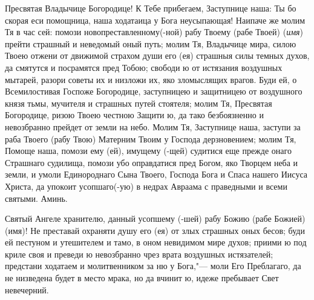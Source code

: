 \mychapterending


\begin{mymulticols}
 


Пресвятая Владычице Богородице! К Тебе прибегаем, Заступнице наша: Ты бо скорая еси помощница, наша ходатаица у Бога неусыпающая! Наипаче же молим Тя в час сей: помози новопреставленному(-ной) рабу Твоему (рабе Твоей) ({\itshape имя}) прейти страшный и неведомый оный путь; молим Тя, Владычице мира, силою Твоею отжени от движимой страхом души его (ея) страшныя силы темных духов, да смятутся и посрамятся пред Тобою; свободи ю от истязания воздушных мытарей, разори советы их и низложи их, яко зломыслящих врагов. Буди ей, о Всемилостивая Госпоже Богородице, заступницею и защитницею от воздушного князя тьмы, мучителя и страшных путей стоятеля; молим Тя, Пресвятая Богородице, ризою Твоею честною Защити ю, да тако безбоязненно и невозбранно прейдет от земли на небо. Молим Тя, Заступнице наша, заступи за раба Твоего (рабу Твою) Матерним Твоим у Господа дерзновением; молим Тя, Помоще наша, помози ему (ей), имущему (-щей) судитися еще прежде онаго Страшнаго судилища, помози убо оправдатися пред Богом, яко Творцем неба и земли, и умоли Единороднаго Сына Твоего, Господа Бога и Спаса нашего Иисуса Христа, да упокоит усопшаго(-ую) в недрах Авраама с праведными и всеми святыми. Аминь.

\end{mymulticols}

\mychapterending


\begin{mymulticols}
 


Святый Ангеле хранителю, данный усопшему (-шей) рабу Божию (рабе Божией) (имя)! Не преставай охраняти душу его (ея) от злых страшных оных бесов; буди ей пестуном и утешителем и тамо, в оном невидимом мире духов; приими ю под криле своя и преведи ю невозбранно чрез врата воздушных истязателей; предстани ходатаем и молитвенником за ню у Бога,"--- моли Его Преблагаго, да не низведена будет в место мрака, но да вчинит ю, идеже пребывает Свет невечерний. 

\end{mymulticols}

\mychapterending


